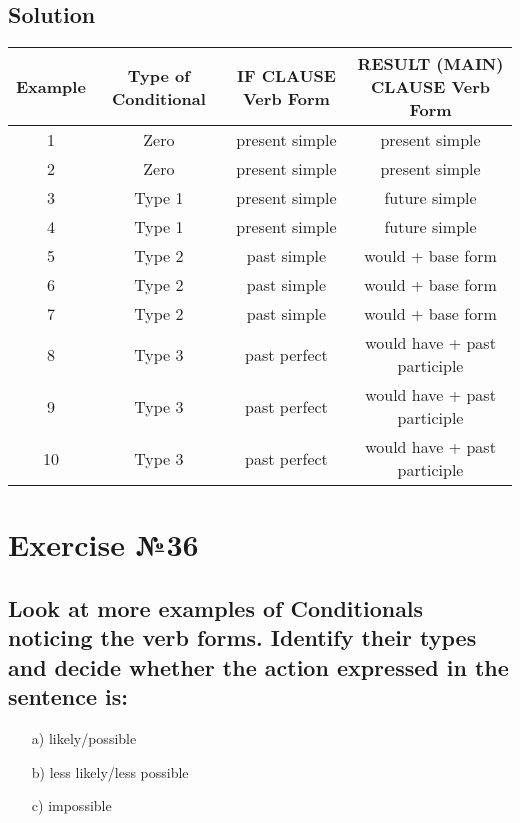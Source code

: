 \subsection*{Solution}
\begin{table}[htbp]
      \centering
      \begin{tabular}{|c|c|c|c|}
            \hline
            Example & Type of Conditional & IF CLAUSE Verb Form & RESULT (MAIN) CLAUSE Verb Form \\
            \hline
            1       & Zero                & present simple      & present simple                 \\
            2       & Zero                & present simple      & present simple                 \\
            3       & Type 1              & present simple      & future simple                  \\
            4       & Type 1              & present simple      & future simple                  \\
            5       & Type 2              & past simple         & would + base form              \\
            6       & Type 2              & past simple         & would + base form              \\
            7       & Type 2              & past simple         & would + base form              \\
            8       & Type 3              & past perfect        & would have + past participle   \\
            9       & Type 3              & past perfect        & would have + past participle   \\
            10      & Type 3              & past perfect        & would have + past participle   \\
            \hline
      \end{tabular}
\end{table}

\section{Exercise №36}
\subsection*{Look at more examples of Conditionals noticing the verb forms. Identify their types and decide whether the action expressed in the sentence is:}
\begin{enumerate}
      \item[a)] likely/possible
      \item[b)] less likely/less possible
      \item[c)] impossible
\end{enumerate}


